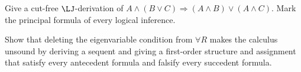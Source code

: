 \begin{exercise}
\label{ex:lk-lj-01}
Give a cut-free \(\LJ\)-derivation of
\(A\land(B\lor C)\Rightarrow(A\land B)\lor(A\land C)\).  Mark the principal
formula of every logical inference.
\end{exercise}

\begin{exercise}
\label{ex:lk-lj-02}
Show that deleting the eigenvariable condition from \(\forall R\) makes the
calculus unsound by deriving a sequent and giving a first-order structure and
assignment that satisfy every antecedent formula and falsify every succedent
formula.
\end{exercise}

